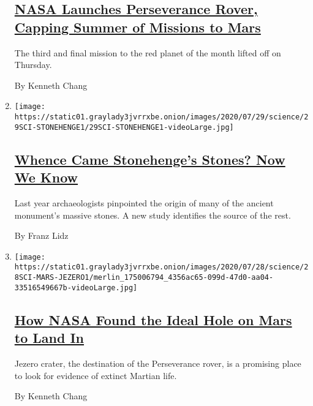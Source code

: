 \begin{enumerate}
{  \subsection{\texorpdfstring{\href{/2020/07/30/science/nasa-mars-launch.html}{NASA
  Launches Perseverance Rover, Capping Summer of Missions to
  Mars}}{NASA Launches Perseverance Rover, Capping Summer of Missions to Mars}}\label{nasa-launches-perseverance-rover-capping-summer-of-missions-to-mars}}

  The third and final mission to the red planet of the month lifted off
  on Thursday.

  By Kenneth Chang
\item
  \texttt{[image: https://static01.graylady3jvrrxbe.onion/images/2020/07/29/science/29SCI-STONEHENGE1/29SCI-STONEHENGE1-videoLarge.jpg]}

  \hypertarget{whence-came-stonehenges-stones-now-we-know}{%
  \subsection{\texorpdfstring{\href{/2020/07/29/science/stonehenge-archaeology-sarsens.html}{Whence
  Came Stonehenge's Stones? Now We
  Know}}{Whence Came Stonehenge's Stones? Now We Know}}\label{whence-came-stonehenges-stones-now-we-know}}

  Last year archaeologists pinpointed the origin of many of the ancient
  monument's massive stones. A new study identifies the source of the
  rest.

  By Franz Lidz
\item
  \texttt{[image: https://static01.graylady3jvrrxbe.onion/images/2020/07/28/science/28SCI-MARS-JEZERO1/merlin\_175006794\_4356ac65-099d-47d0-aa04-33516549667b-videoLarge.jpg]}

  \hypertarget{how-nasa-found-the-ideal-hole-on-mars-to-land-in}{%
  \subsection{\texorpdfstring{\href{/2020/07/28/science/nasa-jezero-perseverance.html}{How
  NASA Found the Ideal Hole on Mars to Land
  In}}{How NASA Found the Ideal Hole on Mars to Land In}}\label{how-nasa-found-the-ideal-hole-on-mars-to-land-in}}

  Jezero crater, the destination of the Perseverance rover, is a
  promising place to look for evidence of extinct Martian life.

  By Kenneth Chang
\end{enumerate}

